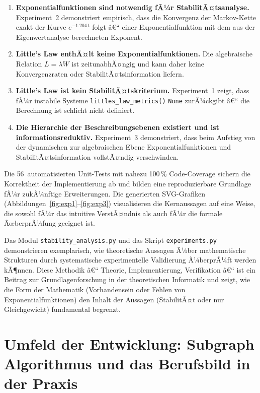 ﻿\documentclass[a4paper,12pt]{report}
\theoremstyle{definition}
\begin{document}
\begin{enumerate}
	\item \textbf{Exponentialfunktionen sind notwendig fÃ¼r
		StabilitÃ¤tsanalyse.}  Experiment~2 demonstriert empirisch,
	dass die Konvergenz der Markov-Kette exakt der Kurve
	$e^{-1.204\,t}$ folgt â€“ einer Exponentialfunktion mit dem
	aus der Eigenwertanalyse berechneten Exponent.
	
	\item \textbf{Little's Law enthÃ¤lt keine Exponentialfunktionen.}
	Die algebraische Relation $L = \lambda W$ ist
	zeitunabhÃ¤ngig und kann daher keine Konvergenzraten oder
	StabilitÃ¤tsinformation liefern.
	
	\item \textbf{Little's Law ist kein StabilitÃ¤tskriterium.}
	Experiment~1 zeigt, dass fÃ¼r instabile Systeme \texttt{littles\_law\_metrics()}
	\texttt{None} zurÃ¼ckgibt â€“ die
	Berechnung ist schlicht nicht definiert.
	
	\item \textbf{Die Hierarchie der Beschreibungsebenen existiert
		und ist informationsreduktiv.}  Experiment~3 demonstriert,
	dass beim Aufstieg von der dynamischen zur algebraischen
	Ebene Exponentialfunktionen und StabilitÃ¤tsinformation
	vollstÃ¤ndig verschwinden.
\end{enumerate}

Die 56~automatisierten Unit-Tests mit nahezu 100\,\% Code-Coverage
sichern die Korrektheit der Implementierung ab und bilden eine
reproduzierbare Grundlage fÃ¼r zukÃ¼nftige Erweiterungen.  Die
generierten SVG-Grafiken (Abbildungen~\ref{fig:exp1}--\ref{fig:exp3})
visualisieren die Kernaussagen auf eine Weise, die sowohl fÃ¼r
das intuitive VerstÃ¤ndnis als auch fÃ¼r die formale ÃœberprÃ¼fung
geeignet ist.

Das Modul \texttt{stability\_analysis.py} und das Skript
\texttt{experiments.py} demonstrieren exemplarisch, wie theoretische
Aussagen Ã¼ber mathematische Strukturen durch systematische
experimentelle Validierung Ã¼berprÃ¼ft werden kÃ¶nnen.  Diese Methodik
â€“ Theorie, Implementierung, Verifikation â€“ ist ein Beitrag zur
Grundlagenforschung in der theoretischen Informatik und zeigt, wie
die Form der Mathematik (Vorhandensein oder Fehlen von
Exponentialfunktionen) den Inhalt der Aussagen (StabilitÃ¤t oder nur
Gleichgewicht) fundamental begrenzt.

\chapter{Umfeld der Entwicklung: Subgraph Algorithmus und das Berufsbild in der Praxis}
\label{ch:subgraph-praxis}
\label{sec:subgraph}
\end{document}
